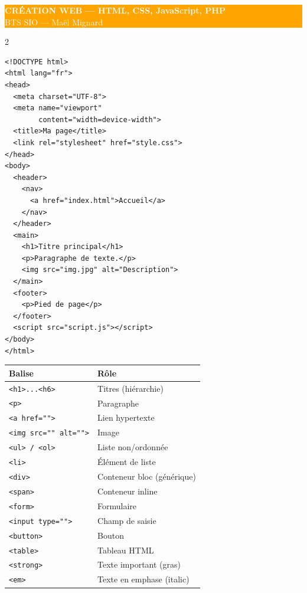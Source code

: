 \documentclass[a4paper,10pt]{article}
\begin{document}
\begin{center}
  \colorbox{orange}{\parbox{\dimexpr\textwidth-2\fboxsep}{
    \centering\vspace{3pt}
    {\LARGE\bfseries\textcolor{white}{CRÉATION WEB — HTML, CSS, JavaScript, PHP}}\\
    {\normalsize\textcolor{white}{BTS SIO — Maël Mignard}}
    \vspace{3pt}
  }}
\end{center}
\vspace{6pt}

\begin{multicols}{2}

\begin{tcolorbox}[basebox, colframe=orange, title=1. HTML — Structure d'une page]
\begin{lstlisting}[style=html]
<!DOCTYPE html>
<html lang="fr">
<head>
  <meta charset="UTF-8">
  <meta name="viewport"
        content="width=device-width">
  <title>Ma page</title>
  <link rel="stylesheet" href="style.css">
</head>
<body>
  <header>
    <nav>
      <a href="index.html">Accueil</a>
    </nav>
  </header>
  <main>
    <h1>Titre principal</h1>
    <p>Paragraphe de texte.</p>
    <img src="img.jpg" alt="Description">
  </main>
  <footer>
    <p>Pied de page</p>
  </footer>
  <script src="script.js"></script>
</body>
</html>
\end{lstlisting}
\end{tcolorbox}

\begin{tcolorbox}[basebox, colframe=orange, title=2. HTML — Balises importantes]
\begin{tabular}{ll}
\toprule
\textbf{Balise} & \textbf{Rôle} \\
\midrule
\texttt{<h1>...<h6>} & Titres (hiérarchie) \\
\texttt{<p>} & Paragraphe \\
\texttt{<a href="">} & Lien hypertexte \\
\texttt{<img src="" alt="">} & Image \\
\texttt{<ul> / <ol>} & Liste non/ordonnée \\
\texttt{<li>} & Élément de liste \\
\texttt{<div>} & Conteneur bloc (générique) \\
\texttt{<span>} & Conteneur inline \\
\texttt{<form>} & Formulaire \\
\texttt{<input type="">} & Champ de saisie \\
\texttt{<button>} & Bouton \\
\texttt{<table>} & Tableau HTML \\
\texttt{<strong>} & Texte important (gras) \\
\texttt{<em>} & Texte en emphase (italic) \\
\bottomrule
\end{tabular}
\end{tcolorbox}


\end{multicols}
\end{document}
